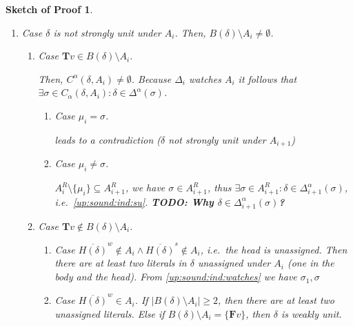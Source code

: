 \documentclass{vutinfth} %
\newcommand{\todo}[1]{{\color{red}\textbf{TODO: {#1}}}} %
\newtheorem{proof-sketch}{Sketch of Proof}[chapter]
\newcommand{\negstrong}[1]{\overline{#1}^s}
\newcommand{\negweak}[1]{\overline{#1}^w}
\newcommand{\ass}{A}
\newcommand{\bT}{\mathbf{T}}
\newcommand{\bF}{\mathbf{F}}
\newcommand{\dal}{\Delta^\alpha}
\newcommand{\headf}{H}
\newcommand{\bodyf}{B}
\newcommand{\sgl}{\mu}
\newcommand{\bsgl}{\sigma}
\begin{document}
\begin{proof-sketch}
\begin{enumerate}
\begin{enumerate}
	
	\item Case $\delta$ is not strongly unit under $A_i$. Then, $\bodyf(\delta) \setminus A_i \not = \emptyset$.


	\begin{enumerate}
		\item Case ${\bT v} \in \bodyf(\delta) \setminus A_i$.
		
		Then, $C^\alpha(\delta, A_{i}) \not = \emptyset$. Because $\Delta_i$ watches $\ass_i$ it follows that $\exists \bsgl \in C_\alpha(\delta, A_i): \delta \in \dal(\sigma)$.
		
		\begin{enumerate}
			\item Case $\sgl_i = \bsgl$.
			
			leads to a contradiction ($\delta$ not strongly unit under $A_{i+1}$)
			
			\item Case $\sgl_i \not = \bsgl$.
			
			$\ass_{i}^R \setminus \{ \sgl_i \} \subseteq \ass_{i+1}^R$, we have $\bsgl \in \ass_{i+1}^R$, thus $\exists \bsgl \in \ass_{i+1}^R : \delta \in \dal_{i+1}(\bsgl)$, i.e.~\ref{up:sound:ind:su}. \todo{Why $\delta \in \dal_{i+1}(\bsgl)$?}
		\end{enumerate}			
			
		\item Case ${\bT v} \not \in \bodyf(\delta) \setminus A_i$.
			\begin{enumerate}
				\item Case $\negweak{\headf(\delta)} \not \in A_{i} \wedge \negstrong{\headf(\delta)} \not \in A_{i}$, i.e.~the head is unassigned. Then there are at least two literals in $\delta$ unassigned under $A_i$ (one in the body and the head). From \ref{up:sound:ind:watches} we have $\bsgl_1, \bsgl $
				\item Case $\negweak{\headf(\delta)} \in A_{i}$.
				If $|\bodyf(\delta) \setminus A_i| \geq 2$, then there are at least two unassigned literals. Else if $\bodyf(\delta) \setminus A_i = \{ {\bF v} \}$, then $\delta$ is weakly unit.
			\end{enumerate}
	\end{enumerate}



\end{enumerate}
\end{enumerate}
\end{proof-sketch}
\end{document}
